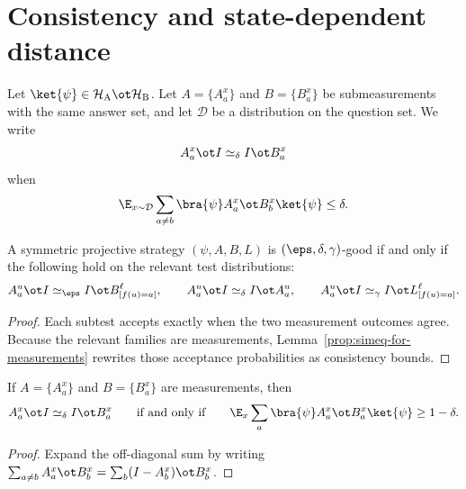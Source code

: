 \section{Consistency and state-dependent distance}
\label{sec:comparing-measurements}


\begin{definition}[Consistency]\label{def:simeq}
	\leanok
	Let $\ket{\psi} \in \mathcal H_{\mathrm A} \ot \mathcal H_{\mathrm B}$. Let $A=\{A_a^x\}$ and $B=\{B_a^x\}$ be submeasurements with the same answer set, and let $\mathcal D$ be a distribution on the question set. We write
	\[
		A_a^x \ot I \simeq_\delta I \ot B_a^x
	\]
	when
	\begin{equation}\label{eq:no-big-Oh}
		\E_{x \sim \mathcal D} \sum_{a \ne b} \bra{\psi} A_a^x \ot B_b^x \ket{\psi} \le \delta.
	\end{equation}
\end{definition}

\begin{lemma}\label{lem:good-strategy-characterization}
	\leanok
	A symmetric projective strategy $(\psi,A,B,L)$ is $(\eps,\delta,\gamma)$-good if and only if the following hold on the relevant test distributions:
	\[
		A_a^u \ot I \simeq_\eps I \ot B^{\ell}_{[f(u)=a]},
		\qquad
		A_a^u \ot I \simeq_\delta I \ot A_a^u,
		\qquad
		A_a^u \ot I \simeq_\gamma I \ot L^{\ell}_{[f(u)=a]}.
	\]
\end{lemma}
\begin{proof}
	\leanok
	Each subtest accepts exactly when the two measurement outcomes agree. Because the relevant families are measurements, Lemma~\ref{prop:simeq-for-measurements} rewrites those acceptance probabilities as consistency bounds.
\end{proof}

\begin{lemma}\label{prop:simeq-for-measurements}
	\leanok
	If $A=\{A_a^x\}$ and $B=\{B_a^x\}$ are measurements, then
	\[
		A_a^x \ot I \simeq_\delta I \ot B_a^x
		\qquad\text{if and only if}\qquad
		\E_x \sum_a \bra{\psi} A_a^x \ot B_a^x \ket{\psi} \ge 1-\delta.
	\]
\end{lemma}
\begin{proof}
	\leanok
	Expand the off-diagonal sum by writing $\sum_{a \ne b} A_a^x \ot B_b^x = \sum_b (I-A_b^x) \ot B_b^x$.
\end{proof}

